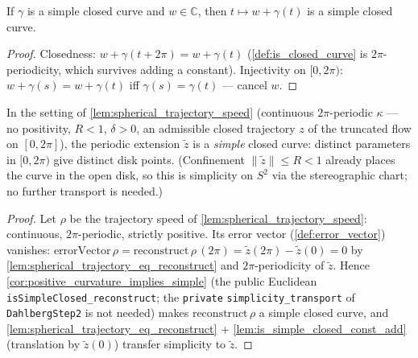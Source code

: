 \begin{lemma}
  \label{lem:is_simple_closed_const_add}
  If $\gamma$ is a simple closed curve and $w\in\mathbb C$, then $t\mapsto w+\gamma(t)$
  is a simple closed curve.
\end{lemma}

\begin{proof}

\leanok
  Closedness: $w+\gamma(t+2\pi)=w+\gamma(t)$ (\cref{def:is_closed_curve} is
  $2\pi$-periodicity, which survives adding a constant). Injectivity on $[0,2\pi)$:
  $w+\gamma(s)=w+\gamma(t)$ iff $\gamma(s)=\gamma(t)$ — cancel $w$.
\end{proof}

\begin{lemma}\leanok
[simplicity]
  \label{lem:spherical_simplicity}
  In the setting of \cref{lem:spherical_trajectory_speed} (continuous
  $2\pi$-periodic $\kappa$ — no positivity, $R<1$, $\delta>0$, an admissible
  closed trajectory $z$ of the truncated flow on
  $[0,2\pi]$), the periodic extension $\tilde z$ is a \emph{simple} closed curve:
  distinct parameters in $[0,2\pi)$ give distinct disk points. (Confinement
  $\|\tilde z\|\le R<1$ already places the curve in the open disk, so this is
  simplicity on $S^2$ via the stereographic chart; no further transport is needed.)
\end{lemma}

\begin{proof}
        \leanok
  Let $\rho$ be the trajectory speed of \cref{lem:spherical_trajectory_speed}:
  continuous, $2\pi$-periodic, strictly positive. Its error vector
  (\cref{def:error_vector}) vanishes:
  $\mathrm{errorVector}\,\rho=\mathrm{reconstruct}\,\rho\,(2\pi)
  =\tilde z(2\pi)-\tilde z(0)=0$ by \cref{lem:spherical_trajectory_eq_reconstruct} and
  $2\pi$-periodicity of $\tilde z$. Hence
  \cref{cor:positive_curvature_implies_simple} (the public Euclidean
  \texttt{isSimpleClosed\_reconstruct}; the \texttt{private}
  \texttt{simplicity\_transport} of \texttt{DahlbergStep2} is not needed) makes
  $\mathrm{reconstruct}\,\rho$ a simple closed curve, and
  \cref{lem:spherical_trajectory_eq_reconstruct} +
  \cref{lem:is_simple_closed_const_add} (translation by $\tilde z(0)$) transfer
  simplicity to $\tilde z$.
\end{proof}
